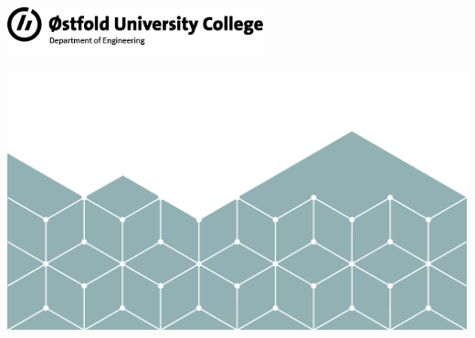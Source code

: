 
\begin{titlepage}

    \begin{flushright}
        \includegraphics*[width=74mm]{images/logo.png}
    \end{flushright}

    \vspace{2cm}



    \noindent{\LARGE\textbf{\thesisTitle}}

    \vspace{0.5cm}

    \noindent{\large {\thesisSubtitle}}

    \vspace{1cm}

    \noindent{\large \authorName}


    \noindent\vspace{1cm}

    \noindent{\large \ProgramName}

    \vspace{0.5cm}

    \noindent{\large \DepartmentName}

    \vspace{1cm}


    \vspace{2cm}

    \noindent{\large \today}

    \centering
    \vspace*{\fill}
    \includegraphics*[width=\textwidth]{images/cover.png}

    \thispagestyle{empty} %
\end{titlepage}
